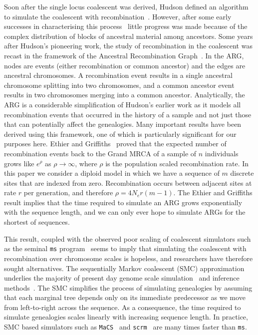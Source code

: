\documentclass[10pt,letterpaper]{article}
\newcommand{\ms}[0]{\texttt{ms}}
\newcommand{\scrm}[0]{\texttt{scrm}}
\newcommand{\MaCS}[0]{\texttt{MaCS}}
\begin{document}
Soon after the single locus coalescent was derived, Hudson defined an algorithm
to simulate the coalescent with recombination~\citep{h83b}. However, after some
early successes in characterising this process~\citep{hk85,kh85} little
progress was made because of the complex distribution of blocks of ancestral
material among ancestors. Some years after Hudson's pioneering work, the study
of recombination in the coalescent was recast in the framework of the Ancestral
Recombination Graph~\citep{g91,gm97}. In the ARG, nodes are events (either
recombination or common ancestor) and the edges are ancestral chromosomes. A
recombination event results in a single ancestral chromosome splitting into two
chromosomes, and a common ancestor event results in two chromosomes merging
into a common ancestor. Analytically, the ARG is a considerable simplification
of Hudson's earlier work as it models all recombination events that occurred in
the history of a sample and not just those that can potentially affect the
genealogies. Many important results have been derived using this framework, one
of which is particularly significant for our purposes here. Ethier and
Griffiths~\citep{eg90} proved that the expected number of recombination events
back to the Grand MRCA of a sample of $n$ individuals grows like $e^\rho$ as
$\rho \rightarrow \infty$, where $\rho$ is the population scaled recombination
rate. In this paper we consider a diploid model in which we have a sequence of
$m$ discrete sites that are indexed from zero. Recombination occurs between
adjacent sites at rate $r$ per generation, and therefore $\rho = 4 N_e r(m -
1)$. The Ethier and Griffiths result implies that the time required to simulate
an ARG grows exponentially with the sequence length, and we can only ever hope
to simulate ARGs for the shortest of sequences.

This result, coupled with the observed poor scaling of coalescent simulators
such as the seminal \texttt{ms} program~\citep{h02} seems to imply that
simulating the coalescent with recombination over chromosome scales is
hopeless, and researchers have therefore sought alternatives. The sequentially
Markov coalescent (SMC) approximation~\citep{mc05,mw06} underlies the majority
of present day genome scale simulation~\citep{cmw09,ef11,szml14} and inference
methods~\citep{ld11,sd14,rhgs14}. The SMC simplifies the process of simulating
genealogies by assuming that each marginal tree depends only on its immediate
predecessor as we move from left-to-right across the sequence. As a
consequence, the time required to simulate genealogies scales linearly with
increasing sequence length. In practice, SMC based simulators such as
\MaCS~\citep{cmw09} and \scrm~\citep{szml14} are many times faster than \ms.
\end{document}
